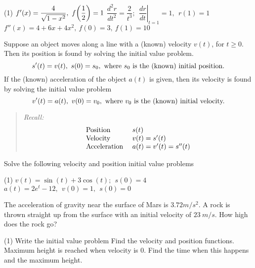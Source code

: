 \documentclass[../mathNotesPreamble]{subfiles}
\begin{document}
  \begin{tasks}[after-item-skip=\stretch{1}, label=\mbox{}](1)
    \task $f'(x)=\dfrac{4}{\sqrt{1-x^2}},\ f\parens{\dfrac{1}{2}}=1$
    \task $\dfrac{d^2r}{dt^2}=\dfrac{2}{t^3};\ \ \left.\dfrac{dr}{dt}\right|_{t=1}=1,\ \ r(1)=1$
    \task $f''(x)=4+6x+4x^2,\ f(0)=3,\ f(1)=10$
  \end{tasks}
  \pagebreak

  \begin{thmBox*}
    Suppose an object moves along a line with a (known) velocity $v(t)$, for $t\geq 0$. Then its position is found by solving the initial value problem.
      \[s'(t)=v(t),\ s(0)=s_0,\ \textnormal{where }s_0\textnormal{ is the (known) initial position.}\]
    If the (known) acceleration of the object $a(t)$ is given, then its velocity is found by solving the initial value problem
      \[v'(t)=a(t),\ v(0)=v_0,\ \textnormal{where }v_0\textnormal{ is the (known) initial velocity.}\]
  \end{thmBox*}

  \begin{quote}
    \textit{Recall:}
      \[\begin{array}{ll}
          \textnormal{Position }& s(t)\\
          \textnormal{Velocity }& v(t)=s'(t)\\
          \textnormal{Acceleration }& a(t)=v'(t)=s''(t)
        \end{array}\]
  \end{quote}
  \begin{ex*}
    Solve the following velocity and position initial value problems
  \end{ex*}
  \begin{tasks}[after-item-skip=\stretch{1}, label=\mbox{}](1)
    \task $v(t)=\sin(t)+3\cos(t);\ \ s(0)=4$
    \task $a(t)=2e^t-12,\ \ v(0)=1,\ \ s(0)=0$
  \end{tasks}
  \pagebreak
  
  \begin{ex*}
    The acceleration of gravity near the surface of Mars is $3.72 m/s^2$. A rock is thrown straight up from the surface with an initial velocity of $23\ m/s$. How high does the rock go?
  \end{ex*}
  \begin{tasks}[after-item-skip=\stretch{1}](1)
    \task Write the initial value problem
    \task Find the velocity and position functions.
    \task Maximum height is reached when velocity is 0. Find the time when this happens and the maximum height.
  \end{tasks}
  \pagebreak
  
\end{document}
